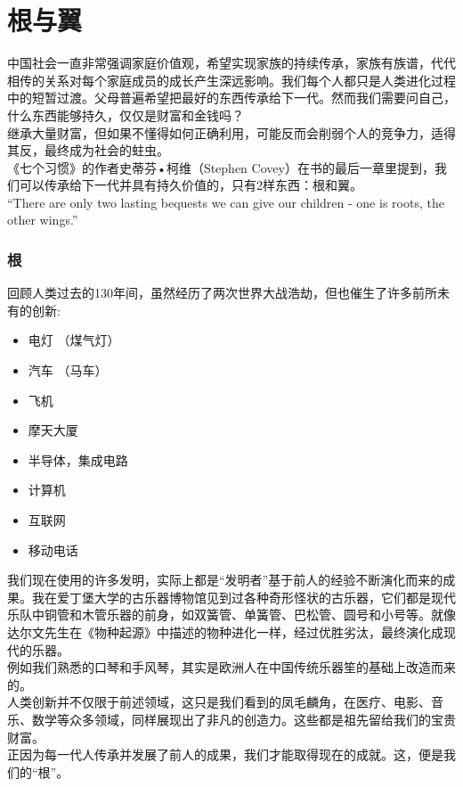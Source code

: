 \chapter{根与翼} %

中国社会一直非常强调家庭价值观，希望实现家族的持续传承，家族有族谱，代代相传的关系对每个家庭成员的成长产生深远影响。我们每个人都只是人类进化过程中的短暂过渡。父母普遍希望把最好的东西传承给下一代。然而我们需要问自己，什么东西能够持久，仅仅是财富和金钱吗？\\
继承大量财富，但如果不懂得如何正确利用，可能反而会削弱个人的竞争力，适得其反，最终成为社会的蛀虫。\\
《七个习惯》的作者史蒂芬•柯维（Stephen
Covey）在书的最后一章里提到，我们可以传承给下一代并具有持久价值的，只有2样东西：根和翼。\\
``There are only two lasting bequests we can give our children - one is
roots, the other wings.''

\hypertarget{ux6839}{%
\subsection{根}\label{ux6839}}

回顾人类过去的130年间，虽然经历了两次世界大战浩劫，但也催生了许多前所未有的创新:

\begin{itemize}
\tightlist
\item
  电灯 （煤气灯）
\item
  汽车 （马车）
\item
  飞机
\item
  摩天大厦
\item
  半导体，集成电路
\item
  计算机
\item
  互联网
\item
  移动电话
\end{itemize}

我们现在使用的许多发明，实际上都是``发明者''基于前人的经验不断演化而来的成果。我在爱丁堡大学的古乐器博物馆见到过各种奇形怪状的古乐器，它们都是现代乐队中铜管和木管乐器的前身，如双簧管、单簧管、巴松管、圆号和小号等。就像达尔文先生在《物种起源》中描述的物种进化一样，经过优胜劣汰，最终演化成现代的乐器。\\
例如我们熟悉的口琴和手风琴，其实是欧洲人在中国传统乐器笙的基础上改造而来的。\\
人类创新并不仅限于前述领域，这只是我们看到的凤毛麟角，在医疗、电影、音乐、数学等众多领域，同样展现出了非凡的创造力。这些都是祖先留给我们的宝贵财富。\\
正因为每一代人传承并发展了前人的成果，我们才能取得现在的成就。这，便是我们的``根''。

